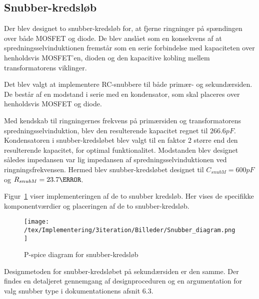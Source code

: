 
\subsection{Snubber-kredsløb}
Der blev designet to snubber-kredsløb for, at fjerne ringninger på spændingen over både MOSFET og diode. De blev anslået som en konsekvens af at spredningsselvinduktionen fremstår som en serie forbindelse med kapaciteten over henholdsvis MOSFET'en, dioden og den kapacitive kobling mellem transformatorens viklinger.  

Det blev valgt at implementere RC-snubbere til både primær- og sekundærsiden. De består af en modstand i serie med en kondensator, som skal placeres over henholdsvis MOSFET og diode. 

Med kendskab til ringningernes frekvens på primærsiden og transformatorens spredningsselvinduktion, blev den resulterende kapacitet regnet til $266.6pF$. Kondensatoren i snubber-kredsløbet blev valgt til en faktor 2 større end den resulterende kapacitet, for optimal funktionalitet\cite{snubber_design}. Modstanden blev designet således impedansen var lig impedansen af spredningsselvinduktionen ved ringningsfrekvensen. Hermed blev snubber-kredsløbet designet til $C_{snubM} = 600pF$ og $R_{snubM} = 23.7\ohm$. 

Figur~\ref{fig:snubber_diagram} viser implementeringen af de to snubber kredsløb. Her vises de specifikke komponentværdier og placeringen af de to snubber-kredsløb.

\begin{figure}[H]
	\centering
	\texttt{[image: /tex/Implementering/3iteration/Billeder/Snubber\_diagram.png]}
	\caption{P-spice diagram for snubber-kredsløb}
	\label{fig:snubber_diagram}
\end{figure}

Designmetoden for snubber-kredsløbet på sekundærsiden er den samme. Der findes en detaljeret gennemgang af designproceduren og en argumentation for valg snubber type i dokumentationens afsnit 6.3.
